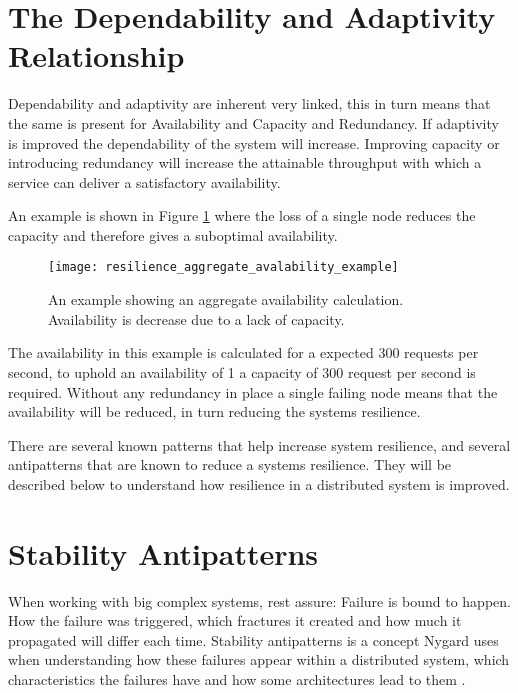 \section{The Dependability and Adaptivity Relationship}
Dependability and adaptivity are inherent very linked, this in turn means that the same is present for Availability and Capacity and Redundancy. If adaptivity is improved the dependability of the system will increase. Improving capacity or introducing redundancy will increase the attainable throughput with which a service can deliver a satisfactory availability.

An example is shown in Figure \ref{fig:resilience_aggregate_avalability_example} where the loss of a single node reduces the capacity and therefore gives a suboptimal availability.

\begin{figure}[!htb]
  \texttt{[image: resilience\_aggregate\_avalability\_example]}  
  \caption{An example showing an aggregate  availability calculation. Availability is decrease due to a lack of capacity.}
  \label{fig:resilience_aggregate_avalability_example}
\end{figure}

The availability in this example is calculated for a expected 300 requests per second, to uphold an availability of 1 a capacity of 300 request per second is required. Without any redundancy in place a single failing node means that the availability will be reduced, in turn reducing the systems resilience.

There are several known patterns that help increase system resilience, and several antipatterns that are known to reduce a systems resilience. They will be described below to understand how resilience in a distributed system is improved.

\section{Stability Antipatterns}
\label{sec:stability_antipatterns}
When working with big complex systems, rest assure: Failure is bound to happen. How the failure was triggered, which fractures it created and how much it propagated will differ each time. Stability antipatterns is a concept Nygard uses when understanding how these failures appear within a distributed system, which characteristics the failures have and how some architectures lead to them \cite[p. 31]{nygard2007release}.

